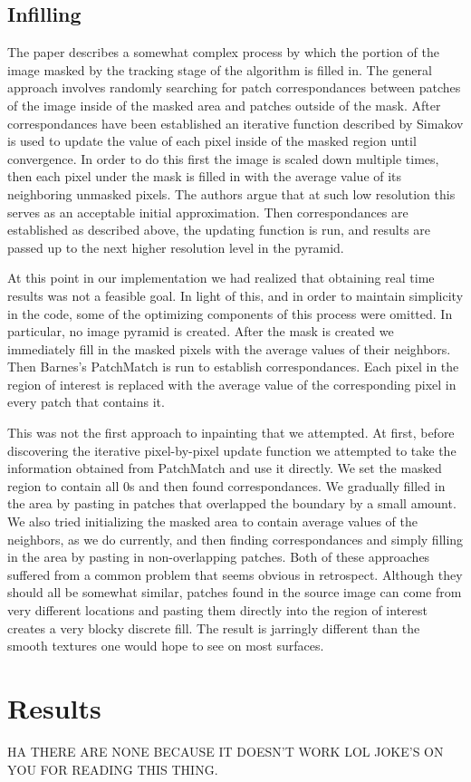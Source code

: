 \documentclass[12pt]{article}
\begin{document}
\subsection{Infilling}
The paper describes a somewhat complex process by which the portion of the image masked by the tracking stage of the algorithm is filled in. The general approach involves randomly searching for patch correspondances between patches of the image inside of the masked area and patches outside of the mask. After correspondances have been established an iterative function described by Simakov is used to update the value of each pixel inside of the masked region until convergence. In order to do this first the image is scaled down multiple times, then each pixel under the mask is filled in with the average value of its neighboring unmasked pixels. The authors argue that at such low resolution this serves as an acceptable initial approximation. Then correspondances are established as described above, the updating function is run, and results are passed up to the next higher resolution level in the pyramid. 

At this point in our implementation we had realized that obtaining real time results was not a feasible goal. In light of this, and in order to maintain simplicity in the code, some of the optimizing components of this process were omitted. In particular, no image pyramid is created. After the mask is created we immediately fill in the masked pixels with the average values of their neighbors. Then Barnes's PatchMatch is run to establish correspondances. Each pixel in the region of interest is replaced with the average value of the corresponding pixel in every patch that contains it. 

This was not the first approach to inpainting that we attempted. At first, before discovering the iterative pixel-by-pixel update function we attempted to take the information obtained from PatchMatch and use it directly. We set the masked region to contain all 0s and then found correspondances. We gradually filled in the area by pasting in patches that overlapped the boundary by a small amount. We also tried initializing the masked area to contain average values of the neighbors, as we do currently, and then finding correspondances and simply filling in the area by pasting in non-overlapping patches. Both of these approaches suffered from a common problem that seems obvious in retrospect. Although they should all be somewhat similar, patches found in the source image can come from very different locations and pasting them directly into the region of interest creates a very blocky discrete fill. The result is jarringly different than the smooth textures one would hope to see on most surfaces. 

\section{Results}
HA THERE ARE NONE BECAUSE IT DOESN'T WORK LOL JOKE'S ON YOU FOR READING THIS THING.
\end{document}
